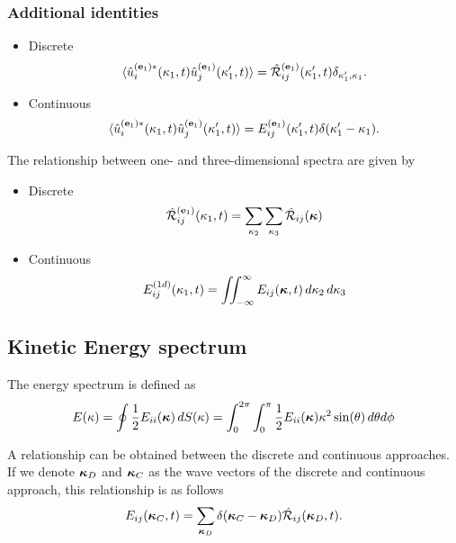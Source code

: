 \documentclass[oneside,a4paper,11pt]{report}
\begin{document}
\subsubsection{Additional identities}
\begin{itemize}
\item Discrete
\begin{equation} 
\langle \hat{u}^{(\mathbf{e}_1)*}_i(\kappa_1,t) \hat{u}^{(\mathbf{e}_1)}_j(\kappa'_1,t) \rangle = \hat{\mathcal{R}}^{(\mathbf{e}_1)}_{ij}(\kappa'_1,t) \delta_{\kappa'_1,\kappa_1}.
\end{equation}
\item Continuous
\begin{equation} 
\langle \hat{u}^{(\mathbf{e}_1)*}_i(\kappa_1,t) \hat{u}^{(\mathbf{e}_1)}_j(\kappa'_1,t) \rangle = E^{(\mathbf{e}_1)}_{ij}(\kappa'_1,t)\delta(\kappa'_1 - \kappa_1).
\end{equation}
\end{itemize}

The relationship between one- and three-dimensional spectra are given by
\begin{itemize}
\item Discrete
\begin{equation}
\hat{\mathcal{R}}_{ij}^{(\mathbf{e}_1)}(\kappa_1,t) = \sum_{\kappa_2} \sum_{\kappa_3} \hat{\mathcal{R}}_{ij} (\boldsymbol\kappa)
\end{equation}
\item Continuous
\begin{equation}
E_{ij}^{(1d)}(\kappa_1,t) = \iint_{-\infty}^{\infty} E_{ij}(\boldsymbol\kappa,t) \, d\kappa_2 \, d\kappa_3
\end{equation}
\end{itemize}

\subsection{Kinetic Energy spectrum}

The energy spectrum is defined as 
\begin{equation}
E( \kappa ) = \oint \frac{1}{2} E_{ii}( \boldsymbol\kappa ) \, dS(\kappa) = \int_0^{2\pi} \int_0^\pi \frac{1}{2} E_{ii}(\boldsymbol\kappa) \kappa^2 \sin(\theta) \, d\theta d\phi
\end{equation}

A relationship can be obtained between the discrete and continuous approaches. If we denote $\boldsymbol\kappa_D$ and $\boldsymbol\kappa_C$ as the wave vectors of the discrete and continuous approach, this relationship is as follows
\begin{equation}
\label{eq:vst_discrete_continuous}
E_{ij}(\boldsymbol\kappa_C,t) = \sum_{\boldsymbol\kappa_D} \delta(\boldsymbol\kappa_C - \boldsymbol\kappa_D) \hat{\mathcal{R}}_{ij}(\boldsymbol\kappa_D,t).
\end{equation}
\end{document}
